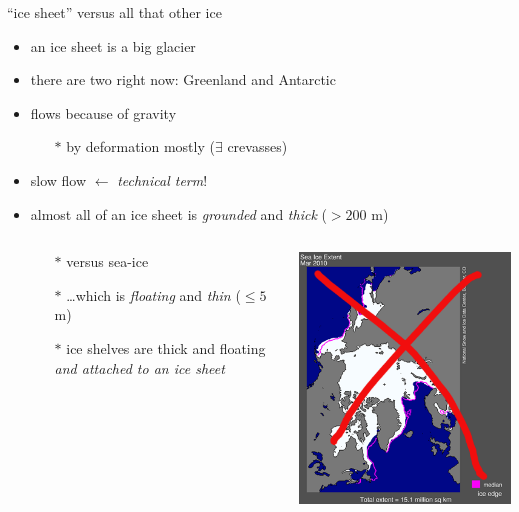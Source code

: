 \documentclass{beamer}
\begin{document}
\begin{frame}{``ice sheet'' versus all that other ice}
  \begin{itemize}
    \item an ice sheet is a big glacier
    \item there are two right now: Greenland and Antarctic
    \item flows because of gravity
       \begin{itemize}
       \small
       \item[$\ast$] by deformation mostly ($\exists$ crevasses)
       \normalsize
       \end{itemize}
    \item slow flow \quad $\longleftarrow$ \emph{technical term}!
    \item almost all of an ice sheet is \emph{grounded} and \emph{thick} ($> 200$ m)
      \begin{columns}
      \begin{column}{0.7\textwidth}
      \begin{itemize}
      \small
      \item[$\ast$] versus sea-ice
      \item[$\ast$] \dots which is \emph{floating} and \emph{thin} ($\le 5$ m)  
      \item[$\ast$] ice shelves are thick and floating \emph{and attached to an ice sheet}
      \normalsize
      \end{itemize}
      \end{column}
      \begin{column}{0.2\textwidth}
      \includegraphics[width=\textwidth]{seaice-bad}

\end{column}
\end{columns}
\end{itemize}
\end{frame}
\end{document}
